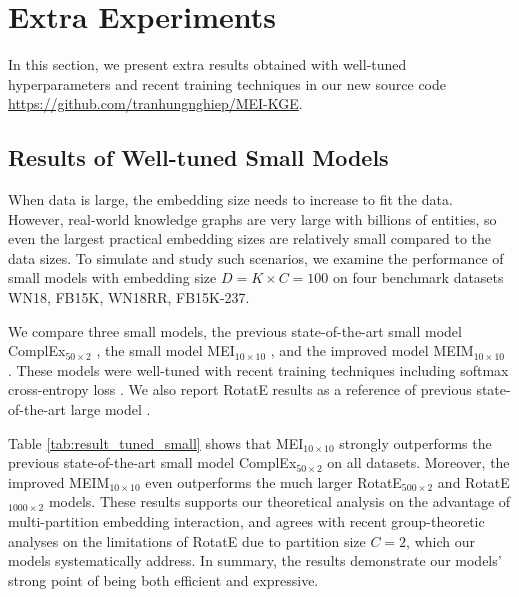 \documentclass{ecai}
\theoremstyle{plain}  \newtheorem{thm}{Theorem}  \newtheorem{lem}[thm]{Lemma}  \newtheorem{prop}[thm]{Proposition}
\theoremstyle{remark}  \newtheorem*{rem}{Remark}
\begin{document}
\clearpage
\appendix

\section{Extra Experiments}
In this section, we present extra results obtained with well-tuned hyperparameters and recent training techniques in our new source code \url{https://github.com/tranhungnghiep/MEI-KGE}.

\subsection{Results of Well-tuned Small Models}
When data is large, the embedding size needs to increase to fit the data. However, real-world knowledge graphs are very large with billions of entities, so even the largest practical embedding sizes are relatively small compared to the data sizes. To simulate and study such scenarios, we examine the performance of small models with embedding size $ D = K \times C = 100 $ on four benchmark datasets WN18, FB15K, WN18RR, FB15K-237.

We compare three small models, the previous state-of-the-art small model ComplEx$ _{50 \times 2} $ \cite{lacroix_canonicaltensordecomposition_2018}, the small model MEI$ _{10 \times 10} $ \cite{tran_multipartitionembeddinginteraction_2020}, and the improved model MEIM$ _{10 \times 10} $ \cite{tran_meimmultipartitionembedding_2022}. These models were well-tuned with recent training techniques including softmax cross-entropy loss \cite{dettmers_convolutional2dknowledge_2018} \cite{lacroix_canonicaltensordecomposition_2018} \cite{ruffinelli_youcanteach_2020}. We also report RotatE results as a reference of previous state-of-the-art large model \cite{sun_rotateknowledgegraph_2019}.

Table \ref{tab:result_tuned_small} shows that MEI$ _{10 \times 10} $ strongly outperforms the previous state-of-the-art small model ComplEx$ _{50 \times 2} $ on all datasets. Moreover, the improved MEIM$ _{10 \times 10} $ even outperforms the much larger RotatE$ _{500 \times 2} $ and RotatE$ _{1000 \times 2} $ models. These results supports our theoretical analysis on the advantage of multi-partition embedding interaction, and agrees with recent group-theoretic analyses \cite{cai_grouprepresentationtheory_2019} on the limitations of RotatE due to partition size $ C = 2 $, which our models systematically address. In summary, the results demonstrate our models' strong point of being both efficient and expressive.
\end{document}
